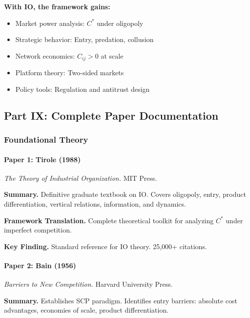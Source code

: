 \textbf{With IO, the framework gains:}
\begin{itemize}
    \item Market power analysis: $C^*$ under oligopoly
    \item Strategic behavior: Entry, predation, collusion
    \item Network economics: $C_{ij} > 0$ at scale
    \item Platform theory: Two-sided markets
    \item Policy tools: Regulation and antitrust design
\end{itemize}

\subsection{Part IX: Complete Paper Documentation}

\subsubsection{Foundational Theory}

\paragraph{Paper 1: Tirole (1988)}

\textit{The Theory of Industrial Organization.}
MIT Press.

\textbf{Summary.}
Definitive graduate textbook on IO. Covers oligopoly, entry, product 
differentiation, vertical relations, information, and dynamics.

\textbf{Framework Translation.}
Complete theoretical toolkit for analyzing $C^*$ under imperfect competition.

\textbf{Key Finding.}
Standard reference for IO theory. 25,000+ citations.

\paragraph{Paper 2: Bain (1956)}

\textit{Barriers to New Competition.}
Harvard University Press.

\textbf{Summary.}
Establishes SCP paradigm. Identifies entry barriers: absolute cost advantages, 
economies of scale, product differentiation.

